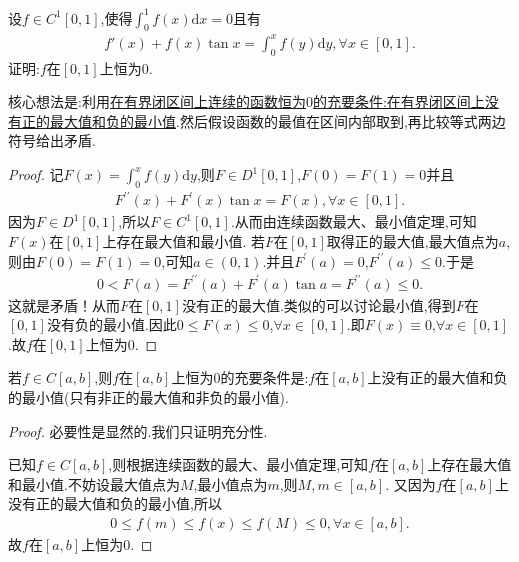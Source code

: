 \documentclass[lang=cn,newtx,10pt,scheme=chinese]{../Template/elegantbook}
\begin{document}
\begin{example}
设$f\in C^1\left[ 0,1 \right] $,使得$\int_0^1{f\left( x \right) \mathrm{d}x}=0$且有
\begin{align*}
f'\left( x \right) +f\left( x \right) \tan x=\int_0^x{f\left( y \right) \mathrm{d}y,\forall x\in \left[ 0,1 \right] .}
\end{align*}
证明:$f$在$[0,1]$上恒为$0$.
\end{example}
\begin{note}
核心想法是:利用\hyperref[conclusion:在有界闭区间上连续的函数恒为$0$的充要条件:在有界闭区间上没有正的最大值和负的最小值]{在有界闭区间上连续的函数恒为$0$的充要条件:在有界闭区间上没有正的最大值和负的最小值}.然后假设函数的最值在区间内部取到,再比较等式两边符号给出矛盾.
\end{note}
\begin{proof}
记\(F(x) = \int_{0}^{x}f(y)\mathrm{d}y\),则\(F \in D^1[0,1]\),\(F(0) = F(1) = 0\)并且
\begin{align*}
F^{\prime\prime}(x) + F^{\prime}(x)\tan x = F(x),\forall x \in [0,1].
\end{align*}
因为\(F \in D^1[0,1]\),所以\(F \in C^1[0,1]\).从而由连续函数最大、最小值定理,可知\(F(x)\)在\([0,1]\)上存在最大值和最小值.
若\(F\)在\([0,1]\)取得正的最大值,最大值点为\(a\),则由\(F(0) = F(1) = 0\),可知\(a \in (0,1)\).并且\(F^{\prime}(a) = 0\),\(F^{\prime\prime}(a) \leqslant 0\).于是
\begin{align*}
0 < F(a) = F^{\prime\prime}(a) + F^{\prime}(a)\tan a = F^{\prime\prime}(a) \leqslant 0.
\end{align*}
这就是矛盾！从而\(F\)在\([0,1]\)没有正的最大值.类似的可以讨论最小值,得到\(F\)在\([0,1]\)没有负的最小值.因此\(0 \leqslant F(x) \leqslant 0\),\(\forall x \in [0,1]\).即\(F(x) \equiv 0\),\(\forall x \in [0,1]\).故\(f\)在\([0,1]\)上恒为\(0\). 
\end{proof}
\begin{conclusion}\label{conclusion:在有界闭区间上连续的函数恒为$0$的充要条件:在有界闭区间上没有正的最大值和负的最小值}
若$f\in C[a,b]$,则$f$在$[a,b]$上恒为$0$的充要条件是:$f$在$[a,b]$上没有正的最大值和负的最小值(只有非正的最大值和非负的最小值).
\begin{proof}
必要性是显然的.我们只证明充分性.

已知$f\in C[a,b]$,则根据连续函数的最大、最小值定理,可知$f$在$[a,b]$上存在最大值和最小值.不妨设最大值点为$M$,最小值点为$m$,则$M,m\in[a,b]$.
又因为$f$在$[a,b]$上没有正的最大值和负的最小值,所以
\begin{align*}
0\leq f(m)\leq f(x)\leq f(M)\leq 0,\forall x\in[a,b].
\end{align*}
故$f$在$[a,b]$上恒为$0$.
\end{proof}
\end{conclusion}
\end{document}

